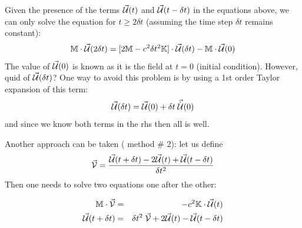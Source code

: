 \vspace{.5cm}

Given the presence of the terms $\vec{\cal U}(t)$ and $\vec{\cal U}(t-\delta t)$ in the equations above,
we can only solve the equation for $t \ge 2\delta t$ (assuming the time step $\delta t$ remains constant):
\[
{\mathbb{M}} \cdot  \vec{\cal U}(2\delta t)
= [2  {\mathbb{M}}  - c^2 \delta t^2 {\mathbb{K}}  ]  \cdot \vec{\cal U}(\delta t) - {\mathbb{M}} \cdot \vec{\cal U}(0)
\]
The value of $\vec{\cal U}(0)$ is known as it is the field at $t=0$ (initial condition). 
However, quid of $\vec{\cal U}(\delta t)$?
One way to avoid this problem is by using a 1st order Taylor expansion of this term:
\[
\vec{\cal U}(\delta t) = \vec{\cal U}(0) + \delta t \; \vec{\dot{{\cal U}}}(0)
\]
and since we know both terms in the rhs then all is well.

\vspace{.6cm}

Another approach can be taken ({\color{orange} method \# 2}): let us define 
\[
\vec{\cal V}=
\frac{ \vec{\cal U}(t+\delta t) -2 \vec{\cal U}(t) + \vec{\cal U}(t-\delta t)}{\delta t^2} 
\]
Then one needs to solve two equations one after the other:

\begin{mdframed}[backgroundcolor=blue!5]
\begin{eqnarray}
{\mathbb{M}} \cdot \vec{\cal V} &=&  -c^2 {\mathbb{K}} \cdot \vec{\cal U}(t) \nonumber\\
\vec{\cal U}(t+\delta t) &=& \delta t^2 \; \vec{\cal V} +2 \vec{\cal U}(t) - \vec{\cal U}(t-\delta t)
\end{eqnarray}
\end{mdframed}


\vspace{.6cm}

